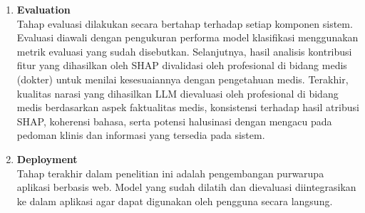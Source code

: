 \begin{enumerate}
\item \textbf{Evaluation}\\
Tahap evaluasi dilakukan secara bertahap terhadap setiap komponen sistem. Evaluasi diawali dengan pengukuran performa model klasifikasi menggunakan metrik evaluasi yang sudah disebutkan. Selanjutnya, hasil analisis kontribusi fitur yang dihasilkan oleh SHAP divalidasi oleh profesional di bidang medis (dokter) untuk menilai kesesuaiannya dengan pengetahuan medis. Terakhir, kualitas narasi yang dihasilkan LLM dievaluasi oleh profesional di bidang medis berdasarkan aspek faktualitas medis, konsistensi terhadap hasil atribusi SHAP, koherensi bahasa, serta potensi halusinasi dengan mengacu pada pedoman klinis dan informasi yang tersedia pada sistem.

\item \textbf{Deployment}\\
Tahap terakhir dalam penelitian ini adalah pengembangan purwarupa aplikasi berbasis web. Model yang sudah dilatih dan dievaluasi diintegrasikan ke dalam aplikasi agar dapat digunakan oleh pengguna secara langsung.
\end{enumerate}

